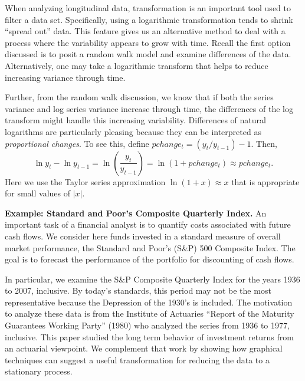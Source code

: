 When analyzing longitudinal data, transformation is an important
tool used to filter a data set. Specifically, using a logarithmic
transformation tends to shrink ``spread out'' data. This feature
gives us an alternative method to deal with a process where the
variability appears to grow with time. Recall the first option
discussed is to posit a random walk model and examine differences of
the data. Alternatively, one may take a logarithmic transform that
helps to reduce increasing variance through time.

Further, from the random walk discussion, we know that if both the
series variance and log series variance increase through time, the
differences of the log transform might handle this increasing
variability. Differences of natural logarithms are particularly
pleasing because they can be interpreted as \emph{proportional
changes}. To see this, define $pchange_t=(y_t/y_{t-1})-1$. Then,
\begin{equation*}
\ln y_t-\ln y_{t-1} = \ln \left( \frac{y_t}{y_{t-1}}\right) = \ln
\left( 1+pchange_t\right) \approx pchange_t.
\end{equation*}
Here we use the Taylor series approximation $\ln (1+x) \approx x$
that is appropriate for small values of $|x|$.

\linejed


\textbf{Example: Standard and Poor's Composite Quarterly
Index.}
An important task of a financial analyst is to quantify costs
associated with future cash flows. We consider here funds invested
in a standard measure of overall market performance, the Standard
and Poor's (S\&P) 500 Composite Index. The goal is to forecast the
performance of the portfolio for discounting of cash flows.

In particular, we examine the S\&P Composite Quarterly Index for the
years 1936 to 2007, inclusive. By today's standards, this period may
not be the most representative because the Depression of the 1930's
is included. The motivation to analyze these data is from the
Institute of Actuaries ``Report of the Maturity Guarantees Working
Party'' (1980) who analyzed the series from 1936 to 1977, inclusive.
This paper studied the long term behavior of investment returns from
an actuarial viewpoint. We complement that work by showing how
graphical techniques can suggest a useful transformation for
reducing the data to a stationary process.

